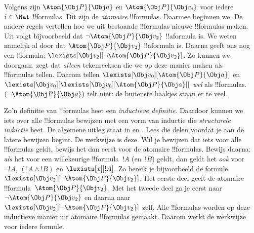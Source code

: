\documentclass[openany]{memoir}
\begin{document}
Volgens  zijn $\Atom{\Obj P}{\Obj a}$ en
$\Atom{\Obj P}{\Obj v_i}$ voor iedere $i \in \Nat$ !!{formula}s. Dit
zijn de \emph{atomaire} !!{formula}s. Daarmee beginnen we. De andere
regels vertellen hoe we uit bestaande !!{formula}s nieuwe
!!{formula}s maken. Uit  volgt bijvoorbeeld dat
$\lnot \Atom{\Obj P}{\Obj v_2}$ !!a{formula} is. We weten namelijk al
door  dat $\Atom{\Obj P}{\Obj v_2}$ !!a{formula} is.
Daarna geeft  ons nog een !!{formula}:
$\lexists[\Obj v_2][\lnot \Atom{\Obj P}{\Obj v_2}]$. Zo kunnen we
doorgaan.  zegt dat \emph{alleen} tekenreeksen die
we op deze manier maken als !!{formula}s tellen. Daarom tellen
$\lexists[\Obj v_0][\Atom{\Obj P}{\Obj a}]$ en $\lexists[\Obj
v_0][\lexists[\Obj v_0][\Atom{\Obj P}{\Obj a}]]$ \emph{wel} als
!!{formula}s. $(\lnot \Atom{\Obj P}{\Obj a})$ telt niet: de buitenste
haakjes staan er te veel.

Zo'n definitie van !!{formula}s heet een \emph{inductieve definitie}.
Daardoor kunnen we iets over alle !!{formula}s bewijzen met een vorm
van inductie die \emph{structurele inductie} heet. De algemene uitleg
staat in  en .
Lees die delen voordat je aan de latere bewijzen begint. De werkwijze
is deze. Wil je bewijzen dat iets voor alle !!{formula}s geldt, bewijs
het dan eerst voor de atomaire !!{formula}s. Bewijs daarna: \emph{als}
het voor een willekeurige !!{formula}~$!A$ (en~$!B$) geldt, dan geldt
het \emph{ook} voor $\lnot !A$, $(!A \land !B)$ en
$\lexists[x][!A]$. Zo bereik je bijvoorbeeld de formule
$\lexists[\Obj v_2][\lnot \Atom{\Obj P}{\Obj v_2}]$. Het eerste deel
geeft de atomaire !!{formula}~$\Atom{\Obj P}{\Obj v_2}$. Met het
tweede deel ga je eerst naar $\lnot \Atom{\Obj P}{\Obj v_2}$ en daarna
naar $\lexists[\Obj v_2][\lnot \Atom{\Obj P}{\Obj v_2}]$ zelf. Alle
!!{formula}s worden op deze inductieve manier uit atomaire
!!{formula}s gemaakt. Daarom werkt de werkwijze voor iedere formule.
\endgroup

\begingroup
\def\olfilename{OLP-0143}
\def\olfilepath{content/first-order-logic/introduction/}
\hypertarget{unit-OLP-0143}{}
\end{document}
